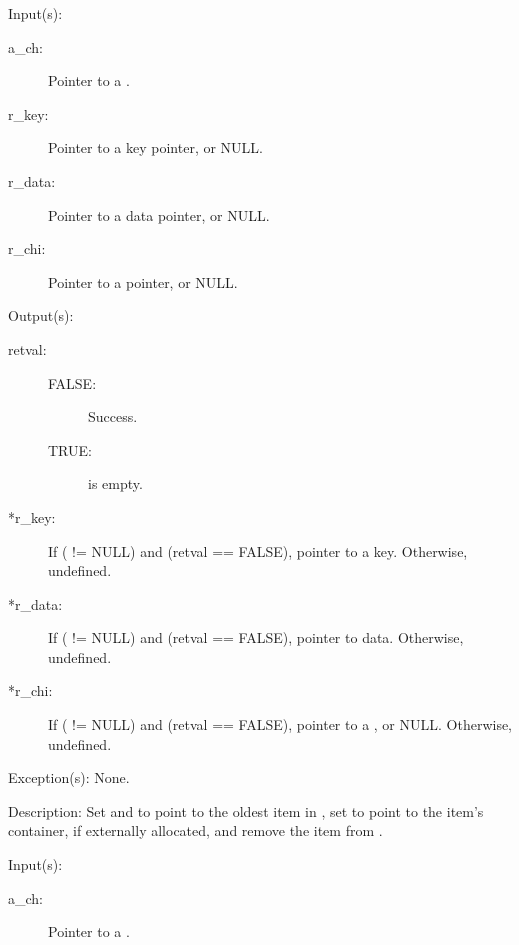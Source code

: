 \begin{capi}
	\begin{capilist}
	\item[Input(s): ]
		\begin{description}\item[]
		\item[a\_ch: ]
			Pointer to a .
		\item[r\_key: ]
			Pointer to a key pointer, or NULL.
		\item[r\_data: ]
			Pointer to a data pointer, or NULL.
		\item[r\_chi: ]
			Pointer to a  pointer, or NULL.
		\end{description}
	\item[Output(s): ]
		\begin{description}\item[]
		\item[retval: ]
			\begin{description}\item[]
			\item[FALSE: ]
				Success.
			\item[TRUE: ]
				 is empty.
			\end{description}
		\item[*r\_key: ]
			If ( != NULL) and (retval == FALSE),
			pointer to a key.  Otherwise, undefined.
		\item[*r\_data: ]
			If ( != NULL) and (retval == FALSE),
			pointer to data.  Otherwise, undefined.
		\item[*r\_chi: ]
			If ( != NULL) and (retval == FALSE),
			pointer to a , or NULL.  Otherwise,
			undefined.
		\end{description}
	\item[Exception(s): ] None.
	\item[Description: ]
		Set  and  to point to the oldest
		item in , set  to point to the item's
		container, if externally allocated, and remove the item from
		.
	\end{capilist}
\label{ch_dump}
	\begin{capilist}
	\item[Input(s): ]
		\begin{description}\item[]
		\item[a\_ch: ]
			Pointer to a \classname{ch}.

\end{description}
\end{capilist}
\end{capi}

